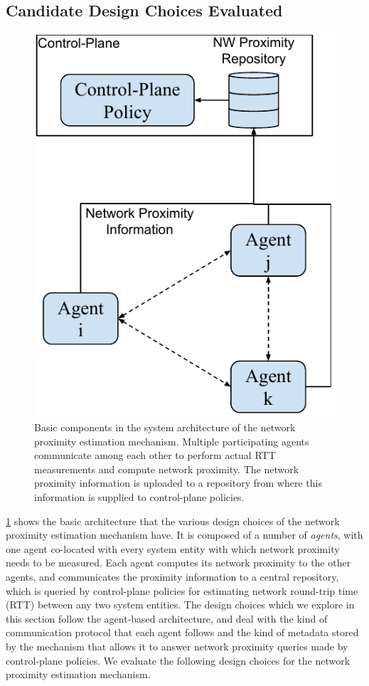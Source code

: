 \subsection{Candidate Design Choices Evaluated}
\begin{figure}
\centering
\includegraphics[width=0.4\linewidth]{figures/design_space/nw_prox/basic_sys_arch.pdf}
\caption{Basic components in the system architecture of the network proximity estimation mechanism. Multiple participating agents communicate among each other to perform actual RTT measurements  and compute network proximity. The network proximity information is uploaded to a repository from where this information is supplied to control-plane policies.}
\label{fig:nw_prox_arch}
\end{figure}
\cref{fig:nw_prox_arch} shows the basic architecture that the various design choices of the network proximity estimation mechanism have. It is composed of a number of \textit{agents}, with one agent co-located with every system entity with which network proximity needs to be measured. Each agent computes its network proximity to the other agents, and communicates the proximity information to a central repository, which is queried by control-plane policies for estimating network round-trip time (RTT) between any two system entities. The design choices which we explore in this section follow the agent-based architecture, and deal with the kind of communication protocol that each agent follows and the kind of metadata stored by the mechanism that allows it to answer network proximity queries made by control-plane policies. We evaluate the following design choices for the network proximity estimation mechanism. 

